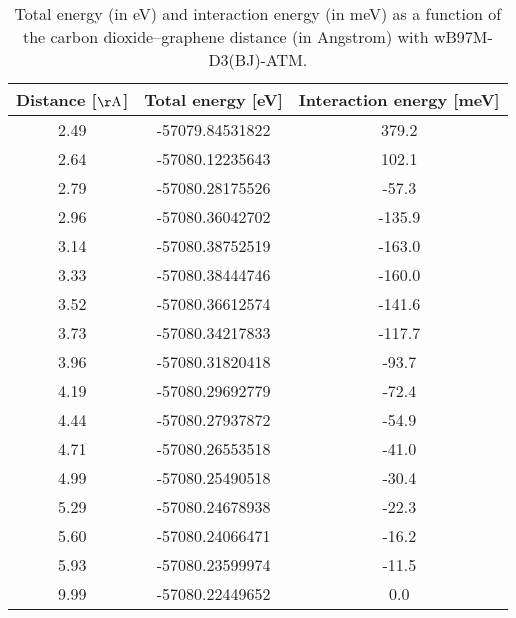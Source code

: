 \begin{table}[h]
\centering
\begin{tabular}{ccc}
\hline
Distance [$\mathrm{\AA}$] & Total energy [eV] & Interaction energy [meV] \\
\hline
2.49 & -57079.84531822 & 379.2 \\
2.64 & -57080.12235643 & 102.1 \\
2.79 & -57080.28175526 & -57.3 \\
2.96 & -57080.36042702 & -135.9 \\
3.14 & -57080.38752519 & -163.0 \\
3.33 & -57080.38444746 & -160.0 \\
3.52 & -57080.36612574 & -141.6 \\
3.73 & -57080.34217833 & -117.7 \\
3.96 & -57080.31820418 & -93.7 \\
4.19 & -57080.29692779 & -72.4 \\
4.44 & -57080.27937872 & -54.9 \\
4.71 & -57080.26553518 & -41.0 \\
4.99 & -57080.25490518 & -30.4 \\
5.29 & -57080.24678938 & -22.3 \\
5.60 & -57080.24066471 & -16.2 \\
5.93 & -57080.23599974 & -11.5 \\
9.99 & -57080.22449652 & 0.0 \\
\hline
\end{tabular}
\caption{Total energy (in eV) and interaction energy (in meV) as a function of the carbon dioxide--graphene distance (in Angstrom) with wB97M-D3(BJ)-ATM.}
\label{SI_dft_table_wB97M-D3(BJ)-ATM}
\end{table}